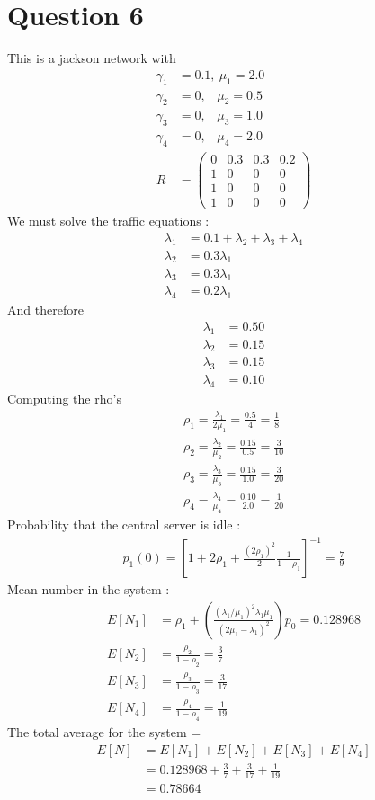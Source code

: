 \documentclass[fleqn]{article}
\newcommand{\mm}[1]{\begin{pmatrix}#1\end{pmatrix}}
\newcommand{\nn}[1]{ \begin{align*}#1\end{align*}}
\begin{document}
\section*{Question 6}
This is a jackson network with
\nn{
	\gamma_1 &= 0.1,\ \mu_1 = 2.0\\
	\gamma_2 &= 0,\ \ \ \,\mu_2 = 0.5\\
	\gamma_3 &= 0,\ \ \ \,\mu_3 = 1.0\\
	\gamma_4 &= 0,\ \ \ \,\mu_4 = 2.0\\
	R	&= \mm{
		0& 0.3& 0.3& 0.2\\
		1& 0  & 0  & 0 \\
		1& 0  & 0  & 0 \\
		1& 0  & 0  & 0 
	}
}
We must solve the traffic equations :
\nn{
	\lambda_1 &= 0.1 + \lambda_2 + \lambda_3 + \lambda_4\\
	\lambda_2 &= 0.3\lambda_1\\
	\lambda_3 &= 0.3\lambda_1\\
	\lambda_4 &= 0.2\lambda_1
}
And therefore
\nn{
	\lambda_1 &= 0.50\\
	\lambda_2 &= 0.15\\
	\lambda_3 &= 0.15\\
	\lambda_4 &= 0.10
}
Computing the rho's 
\nn{
	\rho_1 =\frac{ \lambda_1 } { 2\mu_1 } = \frac{0.5}{4} = \frac{1}{8}\\
	\rho_2 =\frac{ \lambda_2 } { \mu_2 } = \frac{0.15}{0.5} = \frac{3}{10}\\
	\rho_3 =\frac{ \lambda_3 } { \mu_3 } = \frac{0.15}{1.0} = \frac{3}{20}\\
	\rho_4 =\frac{ \lambda_4 } { \mu_4 } = \frac{0.10}{2.0} = \frac{1}{20}
}
Probability that the central server is idle :
\nn{
		p_1(0) = \left[ 1 + 2\rho_1 + \frac{(2\rho_1)^2}{2}\frac{1}{1 -
		\rho_1}\right]^{-1} = \boxed{\frac{7}{9}}
}
Mean number in the system :
\nn{
	E[N_1] &= \rho_1 +
	\left(\frac{(\lambda_1/\mu_1)^2\lambda_1\mu_1}{(2\mu_1-\lambda_1)^2}\right)p_0
	= 0.128968\\
	E[N_2] &= \frac{\rho_2}{1 - \rho_2} = \frac{3}{7}\\
	E[N_3] &= \frac{\rho_3}{1 - \rho_3} = \frac{3}{17}\\
	E[N_4] &= \frac{\rho_4}{1 - \rho_4} = \frac{1}{19}
}
The total average for the system = 
\nn{
	E[N] &= E[N_1] + E[N_2] + E[N_3] + E[N_4]\\
		 &= 0.128968 + \frac{3}{7} + \frac{3}{17} + \frac{1}{19}\\
		 &= \boxed{0.78664}
}
\end{document}

